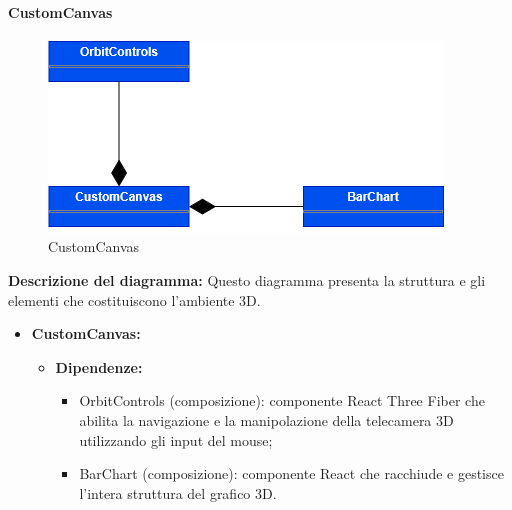\pagebreak

\paragraph{CustomCanvas}
\begin{figure}[h!] \centering
    \includegraphics[scale=0.45]{template/images/uml_front/ui/customcanvas.png}
    \caption{CustomCanvas}
\end{figure}
\textbf{Descrizione del diagramma:}
Questo diagramma presenta la struttura e gli elementi che costituiscono l'ambiente 3D.
\begin{itemize}
    \item \textbf{CustomCanvas:}
          \begin{itemize}
              \item \textbf{Dipendenze:}
                    \begin{itemize}
                        \item OrbitControls (composizione): componente React Three Fiber che abilita la
                              navigazione e la manipolazione della telecamera 3D utilizzando gli input del
                              mouse;
                        \item BarChart (composizione): componente React che racchiude e gestisce l'intera
                              struttura del grafico 3D.
                    \end{itemize}
          \end{itemize}
\end{itemize}

